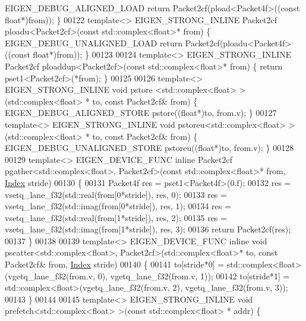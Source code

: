 \begin{DoxyCode}
      EIGEN\_DEBUG\_ALIGNED\_LOAD \textcolor{keywordflow}{return} Packet2cf(pload<Packet4f>((\textcolor{keyword}{const} \textcolor{keywordtype}{float}*)from)); \}
00122 \textcolor{keyword}{template}<> EIGEN\_STRONG\_INLINE Packet2cf ploadu<Packet2cf>(\textcolor{keyword}{const} std::complex<float>* from) \{ 
      EIGEN\_DEBUG\_UNALIGNED\_LOAD \textcolor{keywordflow}{return} Packet2cf(ploadu<Packet4f>((\textcolor{keyword}{const} \textcolor{keywordtype}{float}*)from)); \}
00123 
00124 \textcolor{keyword}{template}<> EIGEN\_STRONG\_INLINE Packet2cf ploaddup<Packet2cf>(\textcolor{keyword}{const} std::complex<float>* from) \{ \textcolor{keywordflow}{return} 
      pset1<Packet2cf>(*from); \}
00125 
00126 \textcolor{keyword}{template}<> EIGEN\_STRONG\_INLINE \textcolor{keywordtype}{void} pstore <std::complex<float> >(std::complex<float> *   to, \textcolor{keyword}{const} 
      Packet2cf& from) \{ EIGEN\_DEBUG\_ALIGNED\_STORE pstore((\textcolor{keywordtype}{float}*)to, from.v); \}
00127 \textcolor{keyword}{template}<> EIGEN\_STRONG\_INLINE \textcolor{keywordtype}{void} pstoreu<std::complex<float> >(std::complex<float> *   to, \textcolor{keyword}{const} 
      Packet2cf& from) \{ EIGEN\_DEBUG\_UNALIGNED\_STORE pstoreu((\textcolor{keywordtype}{float}*)to, from.v); \}
00128 
00129 \textcolor{keyword}{template}<> EIGEN\_DEVICE\_FUNC \textcolor{keyword}{inline} Packet2cf pgather<std::complex<float>, Packet2cf>(\textcolor{keyword}{const} 
      std::complex<float>* from, \hyperlink{namespace_eigen_a62e77e0933482dafde8fe197d9a2cfde}{Index} stride)
00130 \{
00131   Packet4f res = pset1<Packet4f>(0.f);
00132   res = vsetq\_lane\_f32(std::real(from[0*stride]), res, 0);
00133   res = vsetq\_lane\_f32(std::imag(from[0*stride]), res, 1);
00134   res = vsetq\_lane\_f32(std::real(from[1*stride]), res, 2);
00135   res = vsetq\_lane\_f32(std::imag(from[1*stride]), res, 3);
00136   \textcolor{keywordflow}{return} Packet2cf(res);
00137 \}
00138 
00139 \textcolor{keyword}{template}<> EIGEN\_DEVICE\_FUNC \textcolor{keyword}{inline} \textcolor{keywordtype}{void} pscatter<std::complex<float>, Packet2cf>(std::complex<float>* to, \textcolor{keyword}{
      const} Packet2cf& from, \hyperlink{namespace_eigen_a62e77e0933482dafde8fe197d9a2cfde}{Index} stride)
00140 \{
00141   to[stride*0] = std::complex<float>(vgetq\_lane\_f32(from.v, 0), vgetq\_lane\_f32(from.v, 1));
00142   to[stride*1] = std::complex<float>(vgetq\_lane\_f32(from.v, 2), vgetq\_lane\_f32(from.v, 3));
00143 \}
00144 
00145 \textcolor{keyword}{template}<> EIGEN\_STRONG\_INLINE \textcolor{keywordtype}{void} prefetch<std::complex<float> >(\textcolor{keyword}{const} std::complex<float> *   addr) \{ 

\end{DoxyCode}
